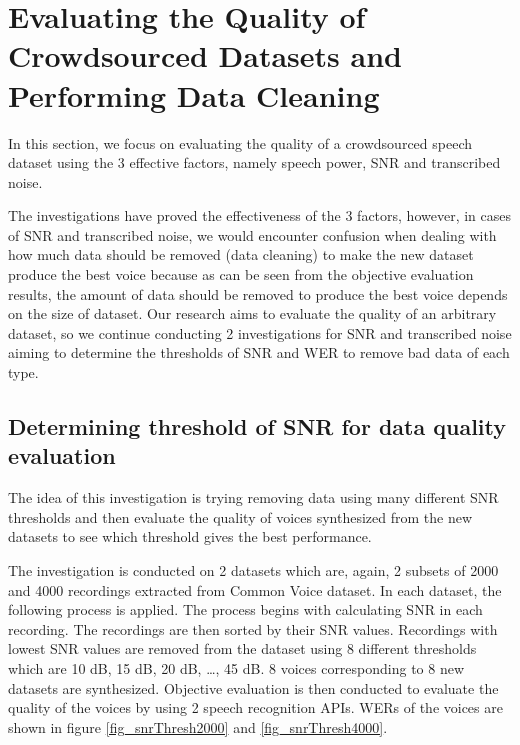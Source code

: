 \documentclass[12pt]{article}
\begin{document}

\clearpage
\section{Evaluating the Quality of Crowdsourced Datasets and Performing Data Cleaning}\label{sec_evaluateAndDataCleaning}
In this section, we focus on evaluating the quality of a crowdsourced speech dataset using the 3 effective factors, namely speech power, SNR and transcribed noise.

The investigations have proved the effectiveness of the 3 factors, however, in cases of SNR and transcribed noise, we would encounter confusion when dealing with how much data should be removed (data cleaning) to make the new dataset produce the best voice because as can be seen from the objective evaluation results, the amount of data should be removed to produce the best voice depends on the size of dataset. Our research aims to evaluate the quality of an arbitrary dataset, so we continue conducting 2 investigations for SNR and transcribed noise aiming to determine the thresholds of SNR and WER to remove bad data of each type.

\subsection{Determining threshold of SNR for data quality evaluation}
The idea of this investigation is trying removing data using many different SNR thresholds and then evaluate the quality of voices synthesized from the new datasets to see which threshold gives the best performance.

The investigation is conducted on 2 datasets which are, again, 2 subsets of 2000 and 4000 recordings extracted from Common Voice dataset. In each dataset, the following process is applied. The process begins with calculating SNR in each recording. The recordings are then sorted by their SNR values. Recordings with lowest SNR values are removed from the dataset using 8 different thresholds which are 10 dB, 15 dB, 20 dB, …, 45 dB. 8 voices corresponding to 8 new datasets are synthesized. Objective evaluation is then conducted to evaluate the quality of the voices by using 2 speech recognition APIs. WERs of the voices are shown in figure \ref{fig_snrThresh2000} and \ref{fig_snrThresh4000}.
\end{document}
